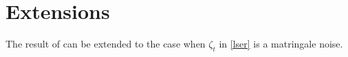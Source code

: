 \section{Extensions}
The result of  can be extended to the case when $\zeta_t$ in \eqref{lser} is a matringale noise. 
